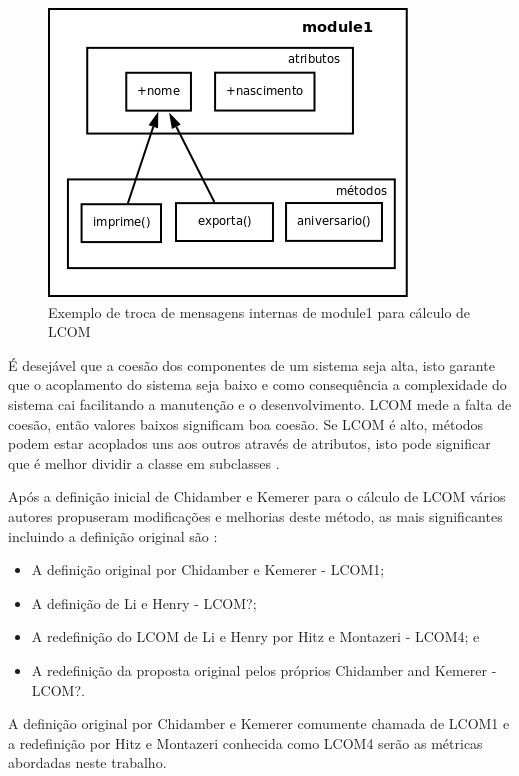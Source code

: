 \begin{figure}[h]
\center
\includegraphics[scale=0.4]{imagens/exemplo-lcom}
\caption{Exemplo de troca de mensagens internas de module1 para cálculo de LCOM}
\label{fig:exemplo-lcom}
\end{figure}

É desejável que a coesão dos componentes de um sistema seja alta, isto garante
que o acoplamento do sistema seja baixo e como consequência a complexidade do
sistema cai facilitando a manutenção e o desenvolvimento. LCOM mede a falta de
coesão, então valores baixos significam boa coesão. Se LCOM é alto, métodos podem
estar acoplados uns aos outros através de atributos, isto pode significar que é
melhor dividir a classe em subclasses \cite{observationsOnLCOM}.

Após a definição inicial de Chidamber e Kemerer para o cálculo de LCOM vários
autores propuseram modificações e melhorias deste método, as mais significantes
incluindo a definição original são \cite{principalComponentAnalysisOfLCOM}:

\begin{itemize}
\item A definição original por Chidamber e Kemerer - LCOM1;
\item A definição de Li e Henry - LCOM?;
\item A redefinição do LCOM de Li e Henry por Hitz e Montazeri - LCOM4; e
\item A redefinição da proposta original pelos próprios Chidamber and Kemerer - LCOM?.
\end{itemize}

A definição original por Chidamber e Kemerer comumente chamada de LCOM1 e a
redefinição por Hitz e Montazeri conhecida como LCOM4 serão as métricas
abordadas neste trabalho.

